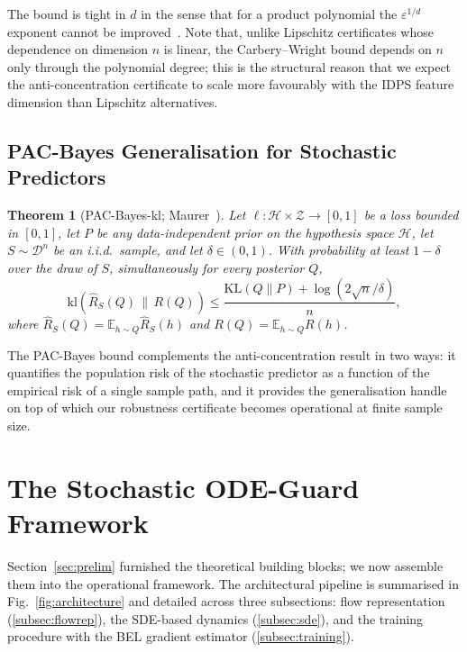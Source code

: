 \documentclass[journal,10pt]{IEEEtran}
\newtheorem{theorem}{Theorem}
\theoremstyle{definition}
\theoremstyle{remark}
\newcommand{\Exp}{\mathbb{E}}
\newcommand{\KL}{\mathrm{KL}}
\newcommand{\Hcal}{\mathcal{H}}
\newcommand{\Dcal}{\mathcal{D}}
\newcommand{\Zcal}{\mathcal{Z}}
\begin{document}
The bound is tight in $d$ in the sense that for a product polynomial
the $\varepsilon^{1/d}$ exponent cannot be improved~\cite{meka2016anticonc}.
Note that, unlike Lipschitz certificates whose dependence on dimension
$n$ is linear, the Carbery--Wright bound depends on $n$ only through
the polynomial degree; this is the structural reason that we expect
the anti-concentration certificate to scale more favourably with the
IDPS feature dimension than Lipschitz alternatives.

\subsection{PAC-Bayes Generalisation for Stochastic Predictors}
\label{subsec:pacbayes}
\begin{theorem}[PAC-Bayes-kl; Maurer~\cite{maurer2004pacbayes}]\label{thm:pacbayes}
Let $\ell:\Hcal\times\Zcal\!\to\![0,1]$ be a loss bounded in
$[0,1]$, let $P$ be any data-independent prior on the hypothesis space
$\Hcal$, let $S\sim\Dcal^n$ be an i.i.d.\ sample, and let
$\delta\in(0,1)$. With probability at least $1-\delta$ over the
draw of $S$, simultaneously for every posterior $Q$,
\begin{equation}\label{eq:pacbayes}
 \mathrm{kl}\!\left(\widehat{R}_S(Q)\,\big\|\,R(Q)\right)
   \leq \frac{\KL(Q\|P)+\log(2\sqrt{n}/\delta)}{n},
\end{equation}
where $\widehat R_S(Q)=\Exp_{h\sim Q}\widehat R_S(h)$ and
$R(Q)=\Exp_{h\sim Q}R(h)$.
\end{theorem}

The PAC-Bayes bound complements the anti-concentration result
in two ways: it quantifies the population risk of the stochastic
predictor as a function of the empirical risk of a single sample
path, and it provides the generalisation handle on top of which our
robustness certificate becomes operational at finite sample size.

\section{The Stochastic ODE-Guard Framework}\label{sec:framework}
Section~\ref{sec:prelim} furnished the theoretical building blocks;
we now assemble them into the operational framework. The
architectural pipeline is summarised in Fig.~\ref{fig:architecture}
and detailed across three subsections: flow representation
(\ref{subsec:flowrep}), the SDE-based dynamics (\ref{subsec:sde}), and
the training procedure with the BEL gradient estimator
(\ref{subsec:training}).
\end{document}
